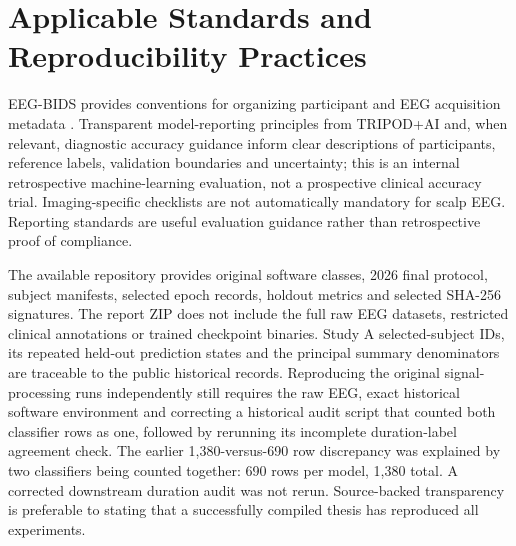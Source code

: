 \section{Applicable Standards and Reproducibility Practices}
EEG-BIDS provides conventions for organizing participant and EEG acquisition metadata \cite{pernet2019}. Transparent model-reporting principles from TRIPOD+AI and, when relevant, diagnostic accuracy guidance inform clear descriptions of participants, reference labels, validation boundaries and uncertainty; this is an internal retrospective machine-learning evaluation, not a prospective clinical accuracy trial. Imaging-specific checklists are not automatically mandatory for scalp EEG. Reporting standards are useful evaluation guidance rather than retrospective proof of compliance.

The available repository provides original software classes, 2026 final protocol, subject manifests, selected epoch records, holdout metrics and selected SHA-256 signatures. The report ZIP does not include the full raw EEG datasets, restricted clinical annotations or trained checkpoint binaries. Study A selected-subject IDs, its repeated held-out prediction states and the principal summary denominators are traceable to the public historical records. Reproducing the original signal-processing runs independently still requires the raw EEG, exact historical software environment and correcting a historical audit script that counted both classifier rows as one, followed by rerunning its incomplete duration-label agreement check. The earlier 1,380-versus-690 row discrepancy was explained by two classifiers being counted together: 690 rows per model, 1,380 total. A corrected downstream duration audit was not rerun. Source-backed transparency is preferable to stating that a successfully compiled thesis has reproduced all experiments.
